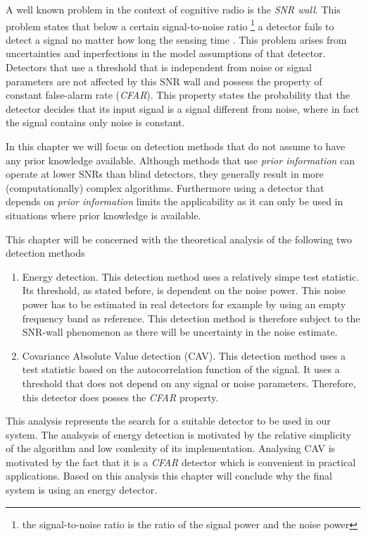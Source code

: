\documentclass[a4paper, openany, oneside]{memoir}
\begin{document}
A well known problem in the context of cognitive radio is the \emph{SNR wall}. This problem states that below a certain signal-to-noise ratio \footnote{the signal-to-noise ratio is the ratio of the signal power and the noise power} a detector fails to detect a signal no matter how long the sensing time \cite{sahai2009spectrum}. This problem arises from uncertainties and inperfections in the model assumptions of that detector. Detectors that use a threshold that is independent from noise or signal parameters are not affected by this SNR wall\cite{axell2012spectrum} and possess the property of constant false-alarm rate (\emph{CFAR}). This property states the probability that the detector decides that its input signal is a signal different from noise, where in fact the signal contains only noise is constant. 

In this chapter we will focus on detection methods that do not assume to have any prior knowledge available. Although methods that use \emph{prior information} can operate at lower SNRs than blind detectors, they generally result in more (computationally) complex algorithms. Furthermore using a detector that depends on \emph{prior information} limits the applicability as it can only be used in situations where prior knowledge is available.

This chapter will be concerned with the theoretical analysis of the following two detection methods

\begin{enumerate}
	\item Energy detection. This detection method uses a relatively simpe test statistic. Its threshold, as stated before, is dependent on 
	the noise power. This noise power has to be estimated in real detectors for example by using an empty frequency band as reference. This detection method is therefore subject to the SNR-wall phenomenon as there will be uncertainty in the noise estimate.
	\item Covariance Absolute Value detection (CAV). This detection method uses a test statistic based on the autocorrelation function of 
	the signal. It uses a threshold that does not depend on any signal or noise parameters. Therefore, this detector does posses the \emph{CFAR}
	property.
\end{enumerate}

This analysis represents the search for a suitable detector to be used in our system.  The analsysis of energy detection is motivated by the relative simplicity of the algorithm and low comlexity of its implementation. Analysing CAV is motivated by the fact that it is a \emph{CFAR} detector which is convenient in practical applications\cite{axell2012spectrum}.  Based on this analysis this chapter will conclude why the final system is using an energy detector. 
\end{document}
